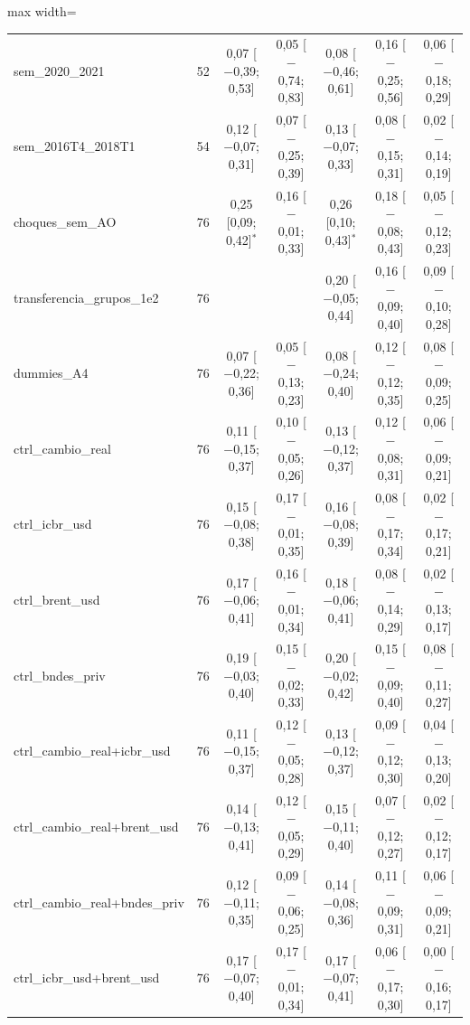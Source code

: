 \begin{table}[htbp]
\begin{adjustbox}{max width=\linewidth}
\begin{tabular}{lcccccc}
sem\_2020\_2021 & 52 & 0{,}07 [$-$0{,}39; 0{,}53] & 0{,}05 [$-$0{,}74; 0{,}83] & 0{,}08 [$-$0{,}46; 0{,}61] & 0{,}16 [$-$0{,}25; 0{,}56] & 0{,}06 [$-$0{,}18; 0{,}29] \\
sem\_2016T4\_2018T1 & 54 & 0{,}12 [$-$0{,}07; 0{,}31] & 0{,}07 [$-$0{,}25; 0{,}39] & 0{,}13 [$-$0{,}07; 0{,}33] & 0{,}08 [$-$0{,}15; 0{,}31] & 0{,}02 [$-$0{,}14; 0{,}19] \\
choques\_sem\_AO & 76 & 0{,}25 [0{,}09; 0{,}42]$^{*}$ & 0{,}16 [$-$0{,}01; 0{,}33] & 0{,}26 [0{,}10; 0{,}43]$^{*}$ & 0{,}18 [$-$0{,}08; 0{,}43] & 0{,}05 [$-$0{,}12; 0{,}23] \\
transferencia\_grupos\_1e2 & 76 &  &  & 0{,}20 [$-$0{,}05; 0{,}44] & 0{,}16 [$-$0{,}09; 0{,}40] & 0{,}09 [$-$0{,}10; 0{,}28] \\
dummies\_A4 & 76 & 0{,}07 [$-$0{,}22; 0{,}36] & 0{,}05 [$-$0{,}13; 0{,}23] & 0{,}08 [$-$0{,}24; 0{,}40] & 0{,}12 [$-$0{,}12; 0{,}35] & 0{,}08 [$-$0{,}09; 0{,}25] \\
ctrl\_cambio\_real & 76 & 0{,}11 [$-$0{,}15; 0{,}37] & 0{,}10 [$-$0{,}05; 0{,}26] & 0{,}13 [$-$0{,}12; 0{,}37] & 0{,}12 [$-$0{,}08; 0{,}31] & 0{,}06 [$-$0{,}09; 0{,}21] \\
ctrl\_icbr\_usd & 76 & 0{,}15 [$-$0{,}08; 0{,}38] & 0{,}17 [$-$0{,}01; 0{,}35] & 0{,}16 [$-$0{,}08; 0{,}39] & 0{,}08 [$-$0{,}17; 0{,}34] & 0{,}02 [$-$0{,}17; 0{,}21] \\
ctrl\_brent\_usd & 76 & 0{,}17 [$-$0{,}06; 0{,}41] & 0{,}16 [$-$0{,}01; 0{,}34] & 0{,}18 [$-$0{,}06; 0{,}41] & 0{,}08 [$-$0{,}14; 0{,}29] & 0{,}02 [$-$0{,}13; 0{,}17] \\
ctrl\_bndes\_priv & 76 & 0{,}19 [$-$0{,}03; 0{,}40] & 0{,}15 [$-$0{,}02; 0{,}33] & 0{,}20 [$-$0{,}02; 0{,}42] & 0{,}15 [$-$0{,}09; 0{,}40] & 0{,}08 [$-$0{,}11; 0{,}27] \\
ctrl\_cambio\_real+icbr\_usd & 76 & 0{,}11 [$-$0{,}15; 0{,}37] & 0{,}12 [$-$0{,}05; 0{,}28] & 0{,}13 [$-$0{,}12; 0{,}37] & 0{,}09 [$-$0{,}12; 0{,}30] & 0{,}04 [$-$0{,}13; 0{,}20] \\
ctrl\_cambio\_real+brent\_usd & 76 & 0{,}14 [$-$0{,}13; 0{,}41] & 0{,}12 [$-$0{,}05; 0{,}29] & 0{,}15 [$-$0{,}11; 0{,}40] & 0{,}07 [$-$0{,}12; 0{,}27] & 0{,}02 [$-$0{,}12; 0{,}17] \\
ctrl\_cambio\_real+bndes\_priv & 76 & 0{,}12 [$-$0{,}11; 0{,}35] & 0{,}09 [$-$0{,}06; 0{,}25] & 0{,}14 [$-$0{,}08; 0{,}36] & 0{,}11 [$-$0{,}09; 0{,}31] & 0{,}06 [$-$0{,}09; 0{,}21] \\
ctrl\_icbr\_usd+brent\_usd & 76 & 0{,}17 [$-$0{,}07; 0{,}40] & 0{,}17 [$-$0{,}01; 0{,}34] & 0{,}17 [$-$0{,}07; 0{,}41] & 0{,}06 [$-$0{,}17; 0{,}30] & 0{,}00 [$-$0{,}16; 0{,}17] \\

\end{tabular}
\end{adjustbox}
\end{table}
